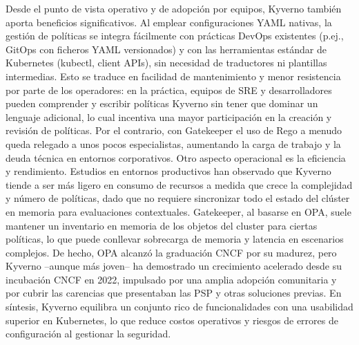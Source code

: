 \documentclass[12pt,twoside,titlepage]{report}
\begin{document}
Desde el punto de vista operativo y de adopción por equipos, Kyverno también aporta beneficios significativos. Al emplear configuraciones YAML nativas, la gestión de políticas se integra fácilmente con prácticas DevOps existentes (p.ej., GitOps con ficheros YAML versionados) y con las herramientas estándar de Kubernetes (kubectl, client APIs), sin necesidad de traductores ni plantillas intermedias. Esto se traduce en facilidad de mantenimiento y menor resistencia por parte de los operadores: en la práctica, equipos de SRE y desarrolladores pueden comprender y escribir políticas Kyverno sin tener que dominar un lenguaje adicional, lo cual incentiva una mayor participación en la creación y revisión de políticas. Por el contrario, con Gatekeeper el uso de Rego a menudo queda relegado a unos pocos especialistas, aumentando la carga de trabajo y la deuda técnica en entornos corporativos. Otro aspecto operacional es la eficiencia y rendimiento. Estudios en entornos productivos han observado que Kyverno tiende a ser más ligero en consumo de recursos a medida que crece la complejidad y número de políticas, dado que no requiere sincronizar todo el estado del clúster en memoria para evaluaciones contextuales. Gatekeeper, al basarse en OPA, suele mantener un inventario en memoria de los objetos del cluster para ciertas políticas, lo que puede conllevar sobrecarga de memoria y latencia en escenarios complejos. De hecho, OPA alcanzó la graduación CNCF por su madurez, pero Kyverno –aunque más joven– ha demostrado un crecimiento acelerado desde su incubación CNCF en 2022, impulsado por una amplia adopción comunitaria y por cubrir las carencias que presentaban las PSP y otras soluciones previas. En síntesis, Kyverno equilibra un conjunto rico de funcionalidades con una usabilidad superior en Kubernetes, lo que reduce costos operativos y riesgos de errores de configuración al gestionar la seguridad. 
\end{document}
